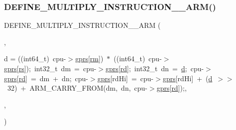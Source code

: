 \subsubsection{\texorpdfstring{D\+E\+F\+I\+N\+E\+\_\+\+M\+U\+L\+T\+I\+P\+L\+Y\+\_\+\+I\+N\+S\+T\+R\+U\+C\+T\+I\+O\+N\+\_\+\_\+\+A\+R\+M()}{DEFINE\_MULTIPLY\_INSTRUCTION\_2\_ARM()}\hspace{0.1cm}{\footnotesize\ttfamily [1/2]}}
{\footnotesize\ttfamily D\+E\+F\+I\+N\+E\+\_\+\+M\+U\+L\+T\+I\+P\+L\+Y\+\_\+\+I\+N\+S\+T\+R\+U\+C\+T\+I\+O\+N\+\_\+\_\+\+A\+RM (\begin{DoxyParamCaption}\item[{S\+M\+L\+AL}]{,  }\item[{int64\+\_\+t}]{d = {\ttfamily ((int64\+\_\+t)~cpu-\/$>$\mbox{\hyperlink{isa-thumb_8c_a6b4b7e13a9a144391615b217c5917bc7}{gprs}}\mbox{[}\mbox{\hyperlink{isa-thumb_8c_a20e40d2fb8c51fa4dd2b4449ad32e111}{rm}}\mbox{]})~$\ast$~((int64\+\_\+t)~cpu-\/$>$\mbox{\hyperlink{isa-thumb_8c_a6b4b7e13a9a144391615b217c5917bc7}{gprs}}\mbox{[}\mbox{\hyperlink{isa-thumb_8c_a03b78d51ad860bbea2f9c98276d0b70b}{rs}}\mbox{]});~int32\+\_\+t~dm~=~cpu-\/$>$\mbox{\hyperlink{isa-thumb_8c_a6b4b7e13a9a144391615b217c5917bc7}{gprs}}\mbox{[}\mbox{\hyperlink{isa-arm_8c_a555541ce18ed9b5fad657a06b22cb465}{rd}}\mbox{]};~int32\+\_\+t~dn~=~\mbox{\hyperlink{isa-thumb_8c_a6f364afbe132c4ecfea48bde1b0618ba}{d}};~cpu-\/$>$\mbox{\hyperlink{isa-thumb_8c_a6b4b7e13a9a144391615b217c5917bc7}{gprs}}\mbox{[}\mbox{\hyperlink{isa-arm_8c_a555541ce18ed9b5fad657a06b22cb465}{rd}}\mbox{]}~=~dm~+~dn;~cpu-\/$>$\mbox{\hyperlink{isa-thumb_8c_a6b4b7e13a9a144391615b217c5917bc7}{gprs}}\mbox{[}rdHi\mbox{]}~=~cpu-\/$>$\mbox{\hyperlink{isa-thumb_8c_a6b4b7e13a9a144391615b217c5917bc7}{gprs}}\mbox{[}rdHi\mbox{]}~+~(\mbox{\hyperlink{isa-thumb_8c_a6f364afbe132c4ecfea48bde1b0618ba}{d}}~$>$$>$~32)~+~ARM\+\_\+CARRY\+\_\+FROM(dm,~dn,~cpu-\/$>$\mbox{\hyperlink{isa-thumb_8c_a6b4b7e13a9a144391615b217c5917bc7}{gprs}}\mbox{[}\mbox{\hyperlink{isa-arm_8c_a555541ce18ed9b5fad657a06b22cb465}{rd}}\mbox{]});},  }\item[{\mbox{\hyperlink{isa-arm_8c_a0aa68e4c9ded96edf53ab6eceb66b377}{A\+R\+M\+\_\+\+N\+E\+U\+T\+R\+A\+L\+\_\+\+H\+I\+\_\+S}}(cpu-\/$>$\mbox{\hyperlink{isa-thumb_8c_a6b4b7e13a9a144391615b217c5917bc7}{gprs}}\mbox{[}\mbox{\hyperlink{isa-arm_8c_a555541ce18ed9b5fad657a06b22cb465}{rd}}\mbox{]}, cpu-\/$>$\mbox{\hyperlink{isa-thumb_8c_a6b4b7e13a9a144391615b217c5917bc7}{gprs}}\mbox{[}rd\+Hi\mbox{]})}]{,  }\item[{3}]{ }\end{DoxyParamCaption})}

